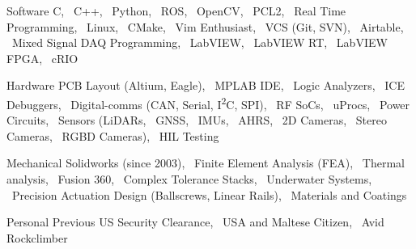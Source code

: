 
\begin{cvskills}

  \cvskill%
      {Software}
      {
            C,  
            \ C++,  
            \ Python,  
            \ ROS,  
            \ OpenCV,  
            \ PCL2,
            \ Real Time Programming,  
            \ Linux,  
            \ CMake,  
            \ Vim Enthusiast,
            \ VCS (Git, SVN),  
            \ Airtable,
            \ Mixed Signal DAQ Programming,  
            \ LabVIEW,  
            \ LabVIEW RT,  
            \ LabVIEW FPGA,  
            \ cRIO
        }

  \cvskill%
      {Hardware} 
      {
            PCB Layout (Altium, Eagle),
            \ MPLAB IDE, 
            \ Logic Analyzers, 
            \ ICE Debuggers, 
            \ Digital-comms (CAN, Serial, I\textsuperscript{2}C, SPI),
            \ RF SoCs, 
            \ uProcs, 
            \ Power Circuits, 
            \ Sensors (LiDARs, 
            \ GNSS, 
            \ IMUs, 
            \ AHRS, 
            \ 2D Cameras, 
            \ Stereo Cameras,  
            \ RGBD Cameras),
            \ HIL Testing
      }

  \cvskill%
      {Mechanical}
      {
            Solidworks (since 2003),
            \ Finite Element Analysis (FEA),
            \ Thermal analysis,
            \ Fusion 360,
            \ Complex Tolerance Stacks,
            \ Underwater Systems,
            \ Precision Actuation Design (Ballscrews, Linear Rails), 
            \ Materials and Coatings
      }

  \cvskill%
      {Personal}
      {
            Previous US Security Clearance, 
            \ USA and Maltese Citizen, 
            \ Avid Rockclimber
      }

\end{cvskills}
